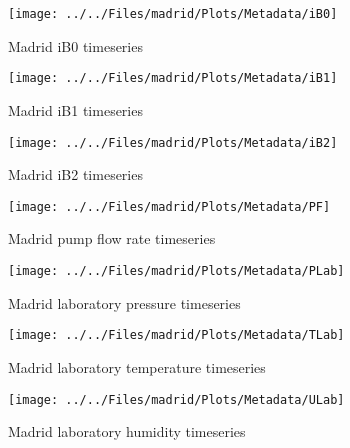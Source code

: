    \begin{figure}
        \centering
\texttt{[image: ../../Files/madrid/Plots/Metadata/iB0]}
    \caption{Madrid iB0 timeseries}
            \label{fig:iB0}
    \end{figure}

    \begin{figure}
        \centering
\texttt{[image: ../../Files/madrid/Plots/Metadata/iB1]}
    \caption{Madrid iB1 timeseries}
            \label{fig:iB1}
    \end{figure}

    \begin{figure}
        \centering
\texttt{[image: ../../Files/madrid/Plots/Metadata/iB2]}
    \caption{Madrid iB2 timeseries}
            \label{fig:iB2}
    \end{figure}

    \begin{figure}
        \centering
\texttt{[image: ../../Files/madrid/Plots/Metadata/PF]}
    \caption{Madrid pump flow rate timeseries}
            \label{fig:PF}
    \end{figure}

       \begin{figure}
        \centering
\texttt{[image: ../../Files/madrid/Plots/Metadata/PLab]}
    \caption{Madrid laboratory pressure timeseries}
            \label{fig:PLab}
    \end{figure}

           \begin{figure}
        \centering
\texttt{[image: ../../Files/madrid/Plots/Metadata/TLab]}
    \caption{Madrid laboratory temperature timeseries}
            \label{fig:TLab}
    \end{figure}

               \begin{figure}
        \centering
\texttt{[image: ../../Files/madrid/Plots/Metadata/ULab]}
    \caption{Madrid laboratory humidity timeseries}
            \label{fig:ULab}
    \end{figure}


